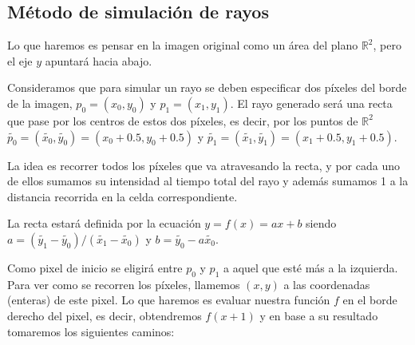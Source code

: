 \documentclass[a4paper]{article}
\begin{document}
\subsection{Método de simulación de rayos}

Lo que haremos es pensar en la imagen original como un área del plano $\mathbb{R}^2$, pero el eje $y$ apuntará hacia abajo. %
 

Consideramos que para simular un rayo se deben especificar dos píxeles del borde de la imagen, $p_0 = (x_0,y_0)$ y $p_1 = (x_1,y_1)$. El rayo 
generado será una recta que pase por los centros de estos dos píxeles, es decir, por los puntos de $\mathbb{R}^2$ \ 
$\tilde{p_0} = (\tilde{x_0}, \tilde{y_0}) = (x_0 + 0.5, y_0 + 0.5)$ y 
$\tilde{p_1} = (\tilde{x_1}, \tilde{y_1}) = (x_1 + 0.5, y_1 + 0.5)$.

La idea es recorrer todos los píxeles que va atravesando la recta, y por cada uno de ellos sumamos su intensidad al tiempo total del rayo y 
además sumamos 1 a la distancia recorrida en la celda correspondiente.

La recta estará definida por la ecuación $y = f(x) = ax + b$ siendo 
$a = (\tilde{y_1} - \tilde{y_0})/(\tilde{x_1} - \tilde{x_0})$ y $b = \tilde{y_0} - a \tilde{x_0}$.

Como pixel de inicio se eligirá entre $p_0$ y $p_1$ a aquel que esté más a la izquierda. Para ver como se recorren los píxeles, llamemos $(x,y)$ 
a las coordenadas (enteras) de este pixel. Lo que haremos es evaluar nuestra función $f$ en el borde derecho del pixel, es decir, obtendremos 
$f(x+1)$ y en base a su resultado tomaremos los siguientes caminos:
\end{document}
